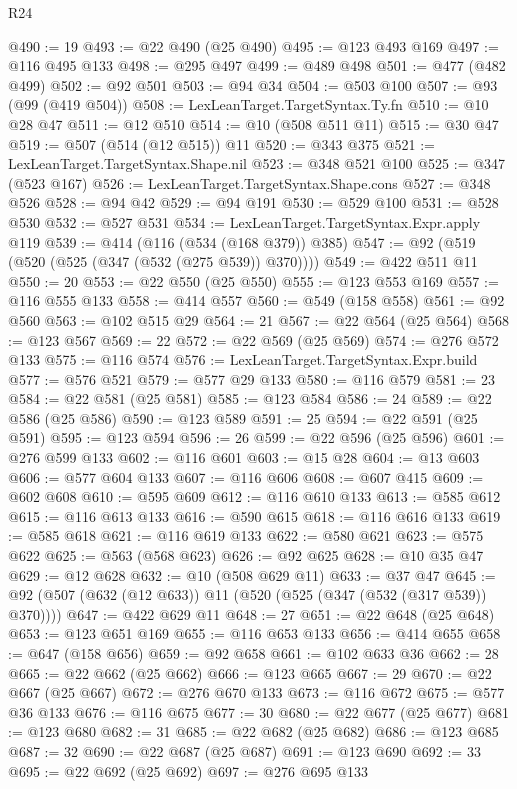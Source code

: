 \begin{lexlean}{R24}
\begin{coremodule}
@490 := 19
@493 := @22 @490 (@25 @490)
@495 := @123 @493 @169
@497 := @116 @495 @133
@498 := @295 @497
@499 := @489 @498
@501 := @477 (@482 @499)
@502 := @92 @501
@503 := @94 @34
@504 := @503 @100
@507 := @93 (@99 (@419 @504))
@508 := LexLeanTarget.TargetSyntax.Ty.fn
@510 := @10 @28 @47
@511 := @12 @510
@514 := @10 (@508 @511 @11)
@515 := @30 @47
@519 := @507 (@514 (@12 @515)) @11
@520 := @343 @375
@521 := LexLeanTarget.TargetSyntax.Shape.nil
@523 := @348 @521 @100
@525 := @347 (@523 @167)
@526 := LexLeanTarget.TargetSyntax.Shape.cons
@527 := @348 @526
@528 := @94 @42
@529 := @94 @191
@530 := @529 @100
@531 := @528 @530
@532 := @527 @531
@534 := LexLeanTarget.TargetSyntax.Expr.apply @119
@539 := @414 (@116 (@534 (@168 @379)) @385)
@547 := @92 (@519 (@520 (@525 (@347 (@532 (@275 @539)) @370))))
@549 := @422 @511 @11
@550 := 20
@553 := @22 @550 (@25 @550)
@555 := @123 @553 @169
@557 := @116 @555 @133
@558 := @414 @557
@560 := @549 (@158 @558)
@561 := @92 @560
@563 := @102 @515 @29
@564 := 21
@567 := @22 @564 (@25 @564)
@568 := @123 @567
@569 := 22
@572 := @22 @569 (@25 @569)
@574 := @276 @572 @133
@575 := @116 @574
@576 := LexLeanTarget.TargetSyntax.Expr.build
@577 := @576 @521
@579 := @577 @29 @133
@580 := @116 @579
@581 := 23
@584 := @22 @581 (@25 @581)
@585 := @123 @584
@586 := 24
@589 := @22 @586 (@25 @586)
@590 := @123 @589
@591 := 25
@594 := @22 @591 (@25 @591)
@595 := @123 @594
@596 := 26
@599 := @22 @596 (@25 @596)
@601 := @276 @599 @133
@602 := @116 @601
@603 := @15 @28
@604 := @13 @603
@606 := @577 @604 @133
@607 := @116 @606
@608 := @607 @415
@609 := @602 @608
@610 := @595 @609
@612 := @116 @610 @133
@613 := @585 @612
@615 := @116 @613 @133
@616 := @590 @615
@618 := @116 @616 @133
@619 := @585 @618
@621 := @116 @619 @133
@622 := @580 @621
@623 := @575 @622
@625 := @563 (@568 @623)
@626 := @92 @625
@628 := @10 @35 @47
@629 := @12 @628
@632 := @10 (@508 @629 @11)
@633 := @37 @47
@645 := @92 (@507 (@632 (@12 @633)) @11 (@520 (@525 (@347 (@532 (@317 @539)) @370))))
@647 := @422 @629 @11
@648 := 27
@651 := @22 @648 (@25 @648)
@653 := @123 @651 @169
@655 := @116 @653 @133
@656 := @414 @655
@658 := @647 (@158 @656)
@659 := @92 @658
@661 := @102 @633 @36
@662 := 28
@665 := @22 @662 (@25 @662)
@666 := @123 @665
@667 := 29
@670 := @22 @667 (@25 @667)
@672 := @276 @670 @133
@673 := @116 @672
@675 := @577 @36 @133
@676 := @116 @675
@677 := 30
@680 := @22 @677 (@25 @677)
@681 := @123 @680
@682 := 31
@685 := @22 @682 (@25 @682)
@686 := @123 @685
@687 := 32
@690 := @22 @687 (@25 @687)
@691 := @123 @690
@692 := 33
@695 := @22 @692 (@25 @692)
@697 := @276 @695 @133

\end{coremodule}
\end{lexlean}
